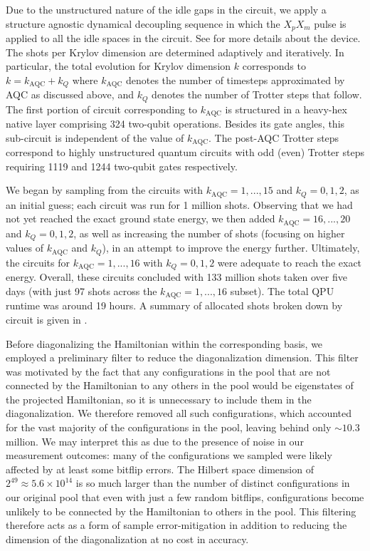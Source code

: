 \documentclass[
  reprint,            %
  amsmath,amssymb,
  aps,
  superscriptaddress, %
  longbibliography
]{revtex4-2}
\theoremstyle{definition}
\begin{document}
Due to the unstructured nature of the idle gaps in the circuit, we apply a structure agnostic dynamical decoupling sequence in which the $X_p X_m$ pulse is applied to all the idle spaces in the circuit.
See  for more details about the device.
The shots per Krylov dimension are determined adaptively and iteratively.
In particular, the total evolution for Krylov dimension $k$ corresponds to $k = k_{\textrm{AQC}} + k_{Q}$ where $k_{\textrm{AQC}}$ denotes the number of timesteps approximated by AQC as discussed above, and $k_Q$ denotes the number of Trotter steps that follow.
The first portion of circuit corresponding to $k_{\textrm{AQC}}$ is structured in a heavy-hex native layer comprising 324 two-qubit operations.
Besides its gate angles, this sub-circuit is independent of the value of $k_{\textrm{AQC}}$.
The post-AQC Trotter steps correspond to highly unstructured quantum circuits with odd (even) Trotter steps requiring 1119 and 1244 two-qubit gates respectively.

We began by sampling from the circuits with ${k_{\textrm{AQC}} = 1,...,15}$ and $k_Q = 0,1,2$, as an initial guess; each circuit was run for 1 million shots. Observing that we had not yet reached the exact ground state energy, we then added $k_{\textrm{AQC}} = 16,...,20$ and $k_Q = 0,1,2$, as well as increasing the number of shots (focusing on higher values of $k_{\textrm{AQC}}$ and $k_Q$), in an attempt to improve the energy further.
Ultimately, the circuits for $k_{\textrm{AQC}}=1,...,16$ with $k_Q = 0,1,2$ were adequate to reach the exact energy.
Overall, these circuits concluded with 133 million shots taken over five days (with just 97 shots across the $k_{\textrm{AQC}}=1,...,16$ subset).
The total QPU runtime was around 19 hours.
A summary of allocated shots broken down by circuit is given in .

Before diagonalizing the Hamiltonian within the corresponding basis, we employed a preliminary filter to reduce the diagonalization dimension.
This filter was motivated by the fact that any configurations in the pool that are not connected by the Hamiltonian to any others in the pool would be eigenstates of the projected Hamiltonian, so it is unnecessary to include them in the diagonalization.
We therefore removed all such configurations, which accounted for the vast majority of the configurations in the pool, leaving behind only $\sim10.3$ million.
We may interpret this as due to the presence of noise in our measurement outcomes: many of the configurations we sampled were likely affected by at least some bitflip errors.
The Hilbert space dimension of $2^{49}\approx5.6\times10^{14}$ is so much larger than the number of distinct configurations in our original pool that even with just a few random bitflips, configurations become unlikely to be connected by the Hamiltonian to others in the pool.
This filtering therefore acts as a form of sample error-mitigation in addition to reducing the dimension of the diagonalization at no cost in accuracy.
\end{document}
